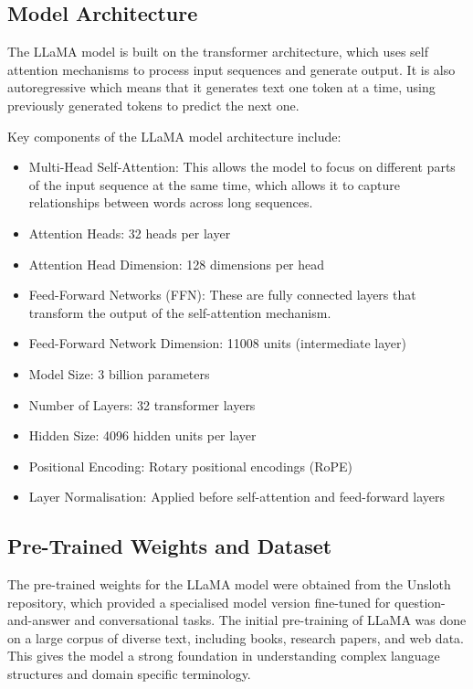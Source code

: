 \documentclass[10pt]{article}
\begin{document}
\subsection{Model Architecture}
The LLaMA model is built on the transformer architecture, which uses self attention mechanisms to process input
sequences and generate output. It is also autoregressive which means that it generates text one token at a time,
using previously generated tokens to predict the next one.

Key components of the LLaMA model architecture include:
\begin{itemize}
    \item Multi-Head Self-Attention: This allows the model to focus on different parts of the input sequence at the same time, which allows it to capture relationships between words across long sequences.
    \item Attention Heads: 32 heads per layer
    \item Attention Head Dimension: 128 dimensions per head
    \item Feed-Forward Networks (FFN): These are fully connected layers that transform the output of the self-attention mechanism.
    \item Feed-Forward Network Dimension: 11008 units (intermediate layer)
    \item Model Size: 3 billion parameters
    \item Number of Layers: 32 transformer layers
    \item Hidden Size: 4096 hidden units per layer
    \item Positional Encoding: Rotary positional encodings (RoPE)
    \item Layer Normalisation: Applied before self-attention and feed-forward layers
\end{itemize}

\subsection{Pre-Trained Weights and Dataset}

The pre-trained weights for the LLaMA model were obtained from the Unsloth repository, which
provided a specialised model version fine-tuned for question-and-answer and conversational tasks.
The initial pre-training of LLaMA was done on a large corpus of diverse text, including books,
research papers, and web data. This gives the model a strong foundation in understanding complex
language structures and domain specific terminology.
\end{document}
